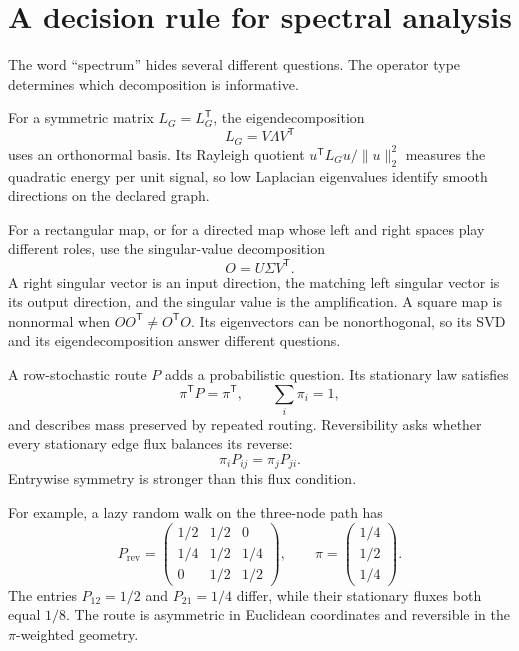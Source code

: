 \section{A decision rule for spectral analysis}
\label{sec:book-spectral-decision-primer}

The word ``spectrum'' hides several different questions.  The operator type determines which
decomposition is informative.

For a symmetric matrix $L_G=L_G^{\mathsf T}$, the eigendecomposition
\begin{equation}
L_G=V\Lambda V^{\mathsf T}
\label{eq:book-primer-symmetric-spectrum}
\end{equation}
uses an orthonormal basis.  Its Rayleigh quotient
$u^{\mathsf T}L_Gu/\|u\|_2^2$ measures the quadratic energy per unit signal, so low Laplacian
eigenvalues identify smooth directions on the declared graph.

For a rectangular map, or for a directed map whose left and right spaces play different roles, use
the singular-value decomposition
\begin{equation}
O=U\Sigma V^{\mathsf T}.
\label{eq:book-primer-directed-svd}
\end{equation}
A right singular vector is an input direction, the matching left singular vector is its output
direction, and the singular value is the amplification.  A square map is nonnormal when
$OO^{\mathsf T}\ne O^{\mathsf T}O$.  Its eigenvectors can be nonorthogonal, so its SVD and its
eigendecomposition answer different questions.

A row-stochastic route $P$ adds a probabilistic question.  Its stationary law satisfies
\begin{equation}
\pi^{\mathsf T}P=\pi^{\mathsf T},
\qquad \sum_i\pi_i=1,
\label{eq:book-primer-stationary-law}
\end{equation}
and describes mass preserved by repeated routing.  Reversibility asks whether every stationary
edge flux balances its reverse:
\begin{equation}
\pi_iP_{ij}=\pi_jP_{ji}.
\label{eq:book-primer-detailed-balance}
\end{equation}
Entrywise symmetry is stronger than this flux condition.

For example, a lazy random walk on the three-node path has
\begin{equation}
P_{\mathrm{rev}}
=\begin{pmatrix}
1/2&1/2&0\\
1/4&1/2&1/4\\
0&1/2&1/2
\end{pmatrix},
\qquad
\pi=\begin{pmatrix}1/4\\1/2\\1/4\end{pmatrix}.
\label{eq:book-primer-reversible-asymmetric-walk}
\end{equation}
The entries $P_{12}=1/2$ and $P_{21}=1/4$ differ, while their stationary fluxes both equal $1/8$.
The route is asymmetric in Euclidean coordinates and reversible in the $\pi$-weighted geometry.

